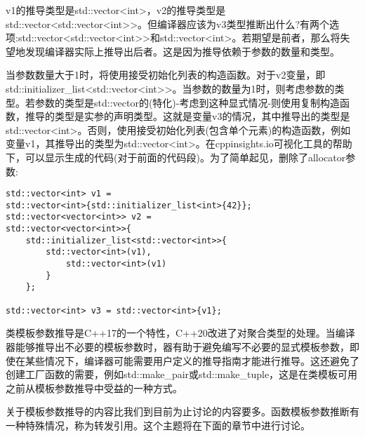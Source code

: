 v1的推导类型是std::vector<int>，v2的推导类型是std::vector<std::vector<int>{}>。但编译器应该为v3类型推断出什么?有两个选项:std::vector<std::vector<int>{}>和std::vector<int>。若期望是前者，那么将失望地发现编译器实际上推导出后者。这是因为推导依赖于参数的数量和类型。

当参数数量大于1时，将使用接受初始化列表的构造函数。对于v2变量，即std::initializer\_list<std::vector<int>{}>。当参数的数量为1时，则考虑参数的类型。若参数的类型是std::vector的(特化)-考虑到这种显式情况-则使用复制构造函数，推导的类型是实参的声明类型。这就是变量v3的情况，其中推导出的类型是std::vector<int>。否则，使用接受初始化列表(包含单个元素)的构造函数，例如变量v1，其推导出的类型为std::vector<int>。在cppinsights.io可视化工具的帮助下，可以显示生成的代码(对于前面的代码段)。为了简单起见，删除了allocator参数:

\begin{lstlisting}[style=styleCXX]
std::vector<int> v1 =
std::vector<int>{std::initializer_list<int>{42}};
std::vector<vector<int>> v2 =
std::vector<vector<int>>{
	std::initializer_list<std::vector<int>>{
		std::vector<int>(v1),
			std::vector<int>(v1)
		}
	};

std::vector<int> v3 = std::vector<int>{v1};
\end{lstlisting}

类模板参数推导是C++17的一个特性，C++20改进了对聚合类型的处理。当编译器能够推导出不必要的模板参数时，器有助于避免编写不必要的显式模板参数，即使在某些情况下，编译器可能需要用户定义的推导指南才能进行推导。这还避免了创建工厂函数的需要，例如std::make\_pair或std::make\_tuple，这是在类模板可用之前从模板参数推导中受益的一种方式。

关于模板参数推导的内容比我们到目前为止讨论的内容要多。函数模板参数推断有一种特殊情况，称为转发引用。这个主题将在下面的章节中进行讨论。







